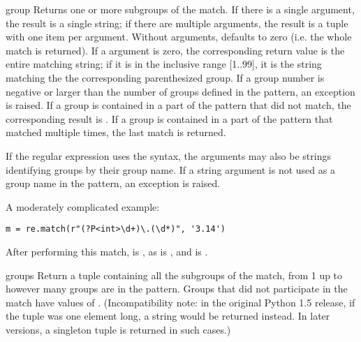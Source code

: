 \begin{methoddesc}[MatchObject]{group}{}
Returns one or more subgroups of the match.  If there is a single
argument, the result is a single string; if there are
multiple arguments, the result is a tuple with one item per argument.
Without arguments,  defaults to zero (i.e. the whole match
is returned).
If a  argument is zero, the corresponding return value is the
entire matching string; if it is in the inclusive range [1..99], it is
the string matching the the corresponding parenthesized group.  If a
group number is negative or larger than the number of groups defined
in the pattern, an  exception is raised.
If a group is contained in a part of the pattern that did not match,
the corresponding result is .  If a group is contained in a 
part of the pattern that matched multiple times, the last match is
returned.

If the regular expression uses the  syntax,
the  arguments may also be strings identifying groups by
their group name.  If a string argument is not used as a group name in 
the pattern, an  exception is raised.

A moderately complicated example:

\begin{verbatim}
m = re.match(r"(?P<int>\d+)\.(\d*)", '3.14')
\end{verbatim}

After performing this match,  is , as is
, and  is .
\end{methoddesc}

\begin{methoddesc}[MatchObject]{groups}{}
Return a tuple containing all the subgroups of the match, from 1 up to
however many groups are in the pattern.  Groups that did not
participate in the match have values of .  (Incompatibility 
note: in the original Python 1.5 release, if the tuple was one element
long, a string would be returned instead.  In later versions, a
singleton tuple is returned in such cases.)
\end{methoddesc}

